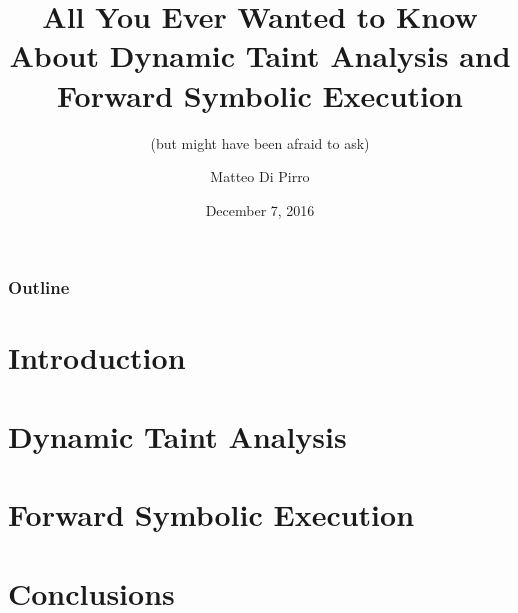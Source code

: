 \documentclass{beamer}
\title{All You Ever Wanted to Know About Dynamic Taint Analysis and Forward Symbolic Execution}
\subtitle{(but might have been afraid to ask)}
\author{Matteo Di Pirro}
\date{December 7, 2016}
\institute{University of Padova}
\begin{document}
\begin{frame}
\titlepage
\end{frame}

\begin{frame}
	\frametitle{Outline}
	\tableofcontents
\end{frame}

\section{Introduction}



\section{Dynamic Taint Analysis}






\section{Forward Symbolic Execution}



\section{Conclusions}



\appendix
\makethanks
\newcommand{\turnOffNumbers}{} %



\end{document}
